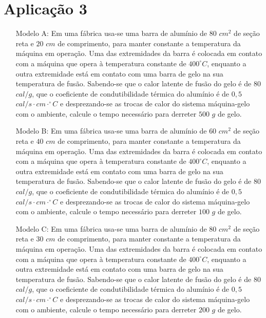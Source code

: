 \section{Aplicação 3} \label{ch:ASA2a3}
\begin{itemize}
    \item[Modelo A:] Em uma fábrica usa-se uma barra de alumínio de $80$ $cm^2$ de seção reta e $20$ $cm$ de comprimento, para manter constante a temperatura da máquina em operação. Uma das extremidades da barra é colocada em contato com a máquina que opera à temperatura constante de $400^{\circ}C$, enquanto a outra extremidade está em contato com uma barra de gelo na sua temperatura de fusão. Sabendo-se que o calor latente de fusão do gelo é de $80$ $cal/g$, que o coeficiente de condutibilidade térmica do alumínio é de $0,5$ $cal/s \cdot cm \cdot ^{\circ}C$ e desprezando-se as trocas de calor do sistema máquina-gelo com o ambiente, calcule o tempo necessário para derreter $500$ $g$ de gelo.
    
    \item[Modelo B:] Em uma fábrica usa-se uma barra de alumínio de $60$ $cm^2$ de seção reta e $40$ $cm$ de comprimento, para manter constante a temperatura da máquina em operação. Uma das extremidades da barra é colocada em contato com a máquina que opera à temperatura constante de $400^{\circ}C$, enquanto a outra extremidade está em contato com uma barra de gelo na sua temperatura de fusão. Sabendo-se que o calor latente de fusão do gelo é de $80$ $cal/g$, que o coeficiente de condutibilidade térmica do alumínio é de $0,5$ $cal/s \cdot cm \cdot ^{\circ}C$ e desprezando-se as trocas de calor do sistema máquina-gelo com o ambiente, calcule o tempo necessário para derreter $100$ $g$ de gelo.
    
    \item[Modelo C:] Em uma fábrica usa-se uma barra de alumínio de $80$ $cm^2$ de seção reta e $30$ $cm$ de comprimento, para manter constante a temperatura da máquina em operação. Uma das extremidades da barra é colocada em contato com a máquina que opera à temperatura constante de $400^{\circ}C$, enquanto a outra extremidade está em contato com uma barra de gelo na sua temperatura de fusão. Sabendo-se que o calor latente de fusão do gelo é de $80$ $cal/g$, que o coeficiente de condutibilidade térmica do alumínio é de $0,5$ $cal/s \cdot cm \cdot ^{\circ}C$ e desprezando-se as trocas de calor do sistema máquina-gelo com o ambiente, calcule o tempo necessário para derreter $200$ $g$ de gelo.
    

\end{itemize}
